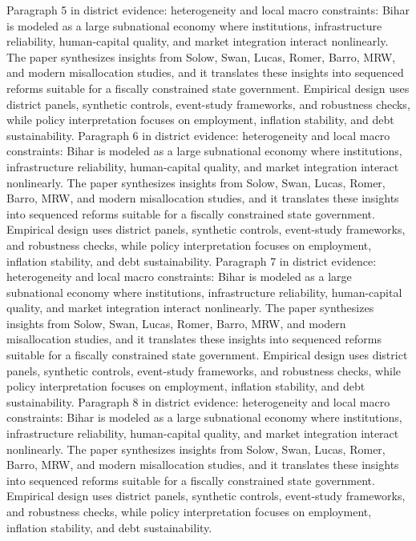 \documentclass[preprint,12pt]{elsarticle}
\begin{document}
Paragraph 5 in district evidence: heterogeneity and local macro constraints: Bihar is modeled as a large subnational economy where institutions, infrastructure reliability, human-capital quality, and market integration interact nonlinearly. The paper synthesizes insights from Solow, Swan, Lucas, Romer, Barro, MRW, and modern misallocation studies, and it translates these insights into sequenced reforms suitable for a fiscally constrained state government. Empirical design uses district panels, synthetic controls, event-study frameworks, and robustness checks, while policy interpretation focuses on employment, inflation stability, and debt sustainability.
Paragraph 6 in district evidence: heterogeneity and local macro constraints: Bihar is modeled as a large subnational economy where institutions, infrastructure reliability, human-capital quality, and market integration interact nonlinearly. The paper synthesizes insights from Solow, Swan, Lucas, Romer, Barro, MRW, and modern misallocation studies, and it translates these insights into sequenced reforms suitable for a fiscally constrained state government. Empirical design uses district panels, synthetic controls, event-study frameworks, and robustness checks, while policy interpretation focuses on employment, inflation stability, and debt sustainability.
Paragraph 7 in district evidence: heterogeneity and local macro constraints: Bihar is modeled as a large subnational economy where institutions, infrastructure reliability, human-capital quality, and market integration interact nonlinearly. The paper synthesizes insights from Solow, Swan, Lucas, Romer, Barro, MRW, and modern misallocation studies, and it translates these insights into sequenced reforms suitable for a fiscally constrained state government. Empirical design uses district panels, synthetic controls, event-study frameworks, and robustness checks, while policy interpretation focuses on employment, inflation stability, and debt sustainability.
Paragraph 8 in district evidence: heterogeneity and local macro constraints: Bihar is modeled as a large subnational economy where institutions, infrastructure reliability, human-capital quality, and market integration interact nonlinearly. The paper synthesizes insights from Solow, Swan, Lucas, Romer, Barro, MRW, and modern misallocation studies, and it translates these insights into sequenced reforms suitable for a fiscally constrained state government. Empirical design uses district panels, synthetic controls, event-study frameworks, and robustness checks, while policy interpretation focuses on employment, inflation stability, and debt sustainability.
\end{document}
